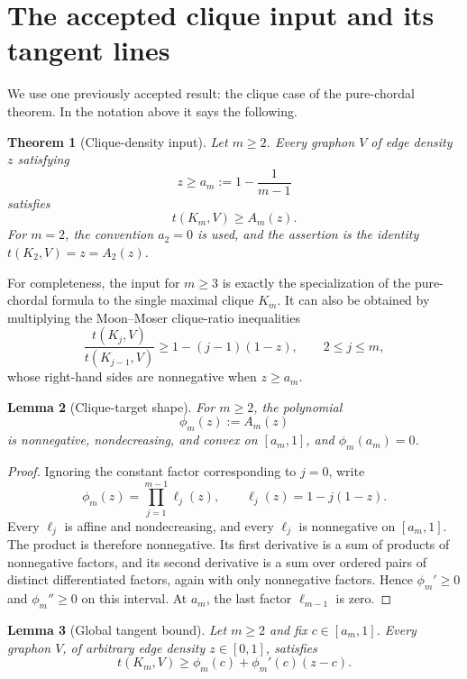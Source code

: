 \documentclass[11pt]{article}
\newtheorem{theorem}{Theorem}[section]
\newtheorem{lemma}[theorem]{Lemma}
\begin{document}
\section{The accepted clique input and its tangent lines}

We use one previously accepted result: the clique case of the
pure-chordal theorem.  In the notation above it says the following.

\begin{theorem}[Clique-density input]
\label{thm:clique-input}
Let $m\geq2$.  Every graphon $V$ of edge density $z$ satisfying
\[
z\geq a_m:=1-\frac1{m-1}
\]
satisfies
\[
t(K_m,V)\geq A_m(z).
\]
For $m=2$, the convention $a_2=0$ is used, and the assertion is the
identity $t(K_2,V)=z=A_2(z)$.
\end{theorem}

For completeness, the input for $m\geq3$ is exactly the specialization
of the pure-chordal formula to the single maximal clique $K_m$.  It can
also be obtained by multiplying the Moon--Moser clique-ratio inequalities
\[
\frac{t(K_j,V)}{t(K_{j-1},V)}
\geq1-(j-1)(1-z),
\qquad 2\leq j\leq m,
\]
whose right-hand sides are nonnegative when $z\geq a_m$.

\begin{lemma}[Clique-target shape]
\label{lem:shape}
For $m\geq2$, the polynomial
\[
\phi_m(z):=A_m(z)
\]
is nonnegative, nondecreasing, and convex on $[a_m,1]$, and
$\phi_m(a_m)=0$.
\end{lemma}

\begin{proof}
Ignoring the constant factor corresponding to $j=0$, write
\[
\phi_m(z)=\prod_{j=1}^{m-1}\ell_j(z),
\qquad
\ell_j(z)=1-j(1-z).
\]
Every $\ell_j$ is affine and nondecreasing, and every $\ell_j$ is
nonnegative on $[a_m,1]$.  The product is therefore nonnegative.  Its
first derivative is a sum of products of nonnegative factors, and its
second derivative is a sum over ordered pairs of distinct differentiated
factors, again with only nonnegative factors.  Hence
$\phi_m'\geq0$ and $\phi_m''\geq0$ on this interval.  At $a_m$, the
last factor $\ell_{m-1}$ is zero.
\end{proof}

\begin{lemma}[Global tangent bound]
\label{lem:tangent}
Let $m\geq2$ and fix $c\in[a_m,1]$.  Every graphon $V$, of arbitrary
edge density $z\in[0,1]$, satisfies
\[
t(K_m,V)
\geq
\phi_m(c)+\phi_m'(c)(z-c).
\]
\end{lemma}
\end{document}
